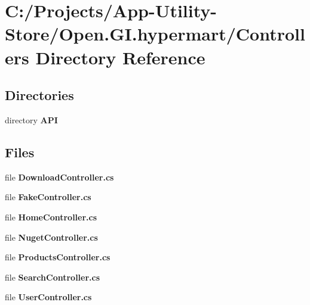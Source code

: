 \section{C\+:/\+Projects/\+App-\/\+Utility-\/\+Store/\+Open.G\+I.\+hypermart/\+Controllers Directory Reference}
\label{dir_da6a3ee0e89edd82fe23d58123f02ba0}
\subsection*{Directories}
\begin{DoxyCompactItemize}
\item 
directory \textbf{ A\+PI}
\end{DoxyCompactItemize}
\subsection*{Files}
\begin{DoxyCompactItemize}
\item 
file \textbf{ Download\+Controller.\+cs}
\item 
file \textbf{ Fake\+Controller.\+cs}
\item 
file \textbf{ Home\+Controller.\+cs}
\item 
file \textbf{ Nuget\+Controller.\+cs}
\item 
file \textbf{ Products\+Controller.\+cs}
\item 
file \textbf{ Search\+Controller.\+cs}
\item 
file \textbf{ User\+Controller.\+cs}
\end{DoxyCompactItemize}
